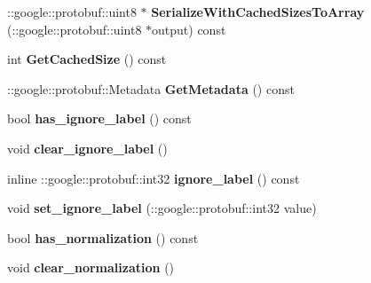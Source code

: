 \begin{DoxyCompactItemize}
\mbox{\label{classcaffe_1_1_loss_parameter_acf2c9e6f2147d05070d621ed854586f7}} 
\+::google\+::protobuf\+::uint8 $\ast$ {\bfseries Serialize\+With\+Cached\+Sizes\+To\+Array} (\+::google\+::protobuf\+::uint8 $\ast$output) const
\item 
\mbox{\label{classcaffe_1_1_loss_parameter_aea065222a31f869ebabd9e520ea3ebeb}} 
int {\bfseries Get\+Cached\+Size} () const
\item 
\mbox{\label{classcaffe_1_1_loss_parameter_a478c05d8220d982f79b9230598aa21c9}} 
\+::google\+::protobuf\+::\+Metadata {\bfseries Get\+Metadata} () const
\item 
\mbox{\label{classcaffe_1_1_loss_parameter_a1f9932ad9b6ed5d3ef1bdbe9d0e4d6b9}} 
bool {\bfseries has\+\_\+ignore\+\_\+label} () const
\item 
\mbox{\label{classcaffe_1_1_loss_parameter_a3bc7dc99841165f1133597325fd3c8ce}} 
void {\bfseries clear\+\_\+ignore\+\_\+label} ()
\item 
\mbox{\label{classcaffe_1_1_loss_parameter_a72a5f928d080efe7cbcd7b5cc4a48abb}} 
inline \+::google\+::protobuf\+::int32 {\bfseries ignore\+\_\+label} () const
\item 
\mbox{\label{classcaffe_1_1_loss_parameter_ac59a5a574e80df12200af33eb7aba560}} 
void {\bfseries set\+\_\+ignore\+\_\+label} (\+::google\+::protobuf\+::int32 value)
\item 
\mbox{\label{classcaffe_1_1_loss_parameter_ab521e29dcae6493bc1759bc9e480ca03}} 
bool {\bfseries has\+\_\+normalization} () const
\item 
\mbox{\label{classcaffe_1_1_loss_parameter_a8e7bfd5e2330e6a377751288865db2d0}} 
void {\bfseries clear\+\_\+normalization} ()
\item 
\mbox{\label{classcaffe_1_1_loss_parameter_a8efa150fea9bcbb2b003aad3f9442bc0}} 

\end{DoxyCompactItemize}
